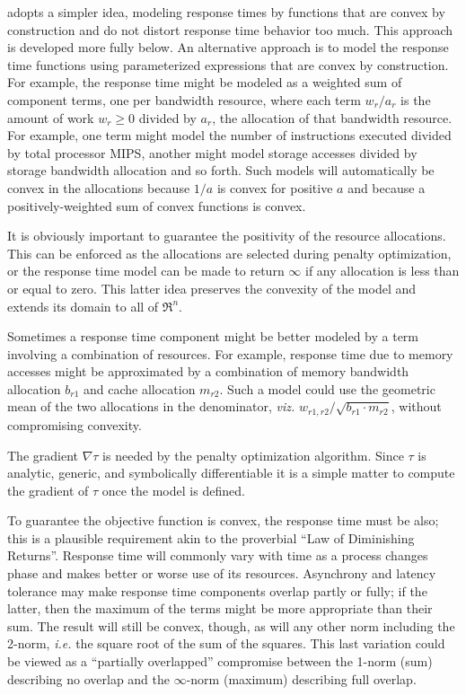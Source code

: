 \pacora adopts a simpler idea, modeling response times by functions that are convex by construction
and do not distort response time behavior too much.  This approach is developed more fully below.
An alternative approach is to model the response time functions using parameterized expressions that are convex by construction.
For example, the response time might be modeled as a weighted sum of component terms,
one per bandwidth resource, where each term $w_r/a_r$ is
the amount of work $w_r \geq 0$ divided by $a_r$, the allocation of that bandwidth resource\cite{Snav}.
For example,
one term might model the number of instructions executed divided by total processor MIPS,
another might model storage accesses divided by storage bandwidth allocation and so forth.
Such models will automatically be convex in the allocations because $1/a$ is convex for positive $a$
and because a positively-weighted sum of convex functions is convex.

It is obviously important to guarantee the positivity of the resource allocations.
This can be enforced as the allocations are selected during penalty optimization,
or the response time model can be made to return $\infty$ if any allocation is less than or equal to zero.
This latter idea preserves the convexity of the model and extends its domain to all of $\Re^n$.

Sometimes a response time component might be better modeled by a term involving a combination of resources.
For example, response time due to memory accesses might be approximated
by a combination of memory bandwidth allocation $b_{r1}$ and cache allocation $m_{r2}$.
Such a model could use the geometric mean of the two allocations in the denominator,
\emph{viz.} $w_{r1,r2}/\sqrt{b_{r1}\cdot m_{r2}}$, without compromising convexity.

The gradient $\nabla\tau$ is needed by the penalty optimization algorithm.
Since $\tau$ is analytic, generic, and symbolically differentiable
it is a simple matter to compute the gradient of $\tau$ once the model is defined.

To guarantee the objective function is convex, the response time must be also;
this is a plausible requirement akin to the proverbial ``Law of Diminishing Returns''.
Response time will commonly vary with time as a process changes phase and makes better or worse use of its resources.
Asynchrony and latency tolerance may make response time components overlap partly or fully;
if the latter, then the maximum of the terms might be more appropriate than their sum.
The result will still be convex, though, as will any other norm including the 2-norm,
\emph{i.e.} the square root of the sum of the squares.
This last variation could be viewed as a ``partially overlapped'' compromise between
the 1-norm (sum) describing no overlap and the $\infty$-norm (maximum) describing full overlap.

